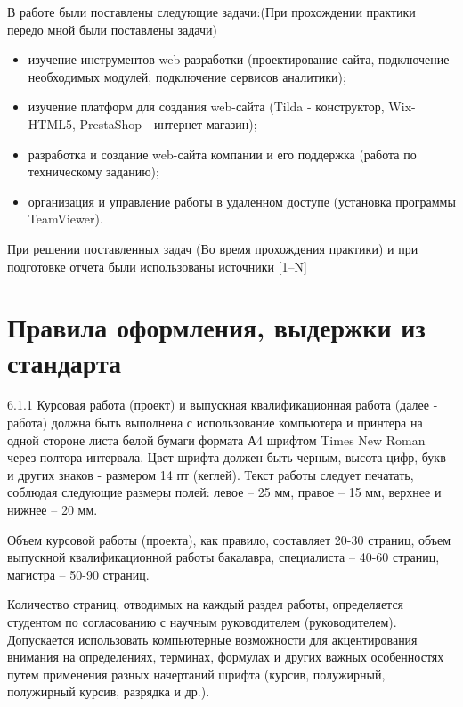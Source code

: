 \documentclass[bachelor, och, coursework, times]{SCWorks}
\begin{document}
В работе были поставлены следующие задачи:(При прохождении практики передо мной были поставлены задачи)
\begin{itemize}
  \item изучение инструментов web-разработки (проектирование сайта, подключение необходимых модулей, подключение сервисов аналитики);
  \item изучение платформ для создания web-сайта (Tilda - конструктор, Wix- HTML5, PrestaShop - интернет-магазин);
  \item разработка и создание web-сайта компании и его поддержка (работа по техническому заданию);
  \item организация и управление работы в удаленном доступе (установка программы TeamViewer).
\end{itemize}

При решении поставленных задач (Во время прохождения практики) и при подготовке отчета были использованы источники [1--N]



\section{Правила оформления, выдержки из стандарта}

6.1.1 Курсовая работа (проект) и выпускная квалификационная работа (далее - работа) должна быть выполнена с использование компьютера и принтера на
одной стороне листа белой бумаги формата А4 шрифтом Times New Roman через
полтора интервала.
Цвет шрифта должен быть черным, высота цифр, букв и других знаков -
размером 14 пт (кеглей).
Текст работы следует печатать, соблюдая следующие размеры полей: левое
– 25 мм, правое – 15 мм, верхнее и нижнее – 20 мм.

Объем курсовой работы (проекта), как правило, составляет 20-30 страниц,
объем выпускной квалификационной работы бакалавра, специалиста – 40-60
страниц, магистра – 50-90 страниц.

Количество страниц, отводимых на каждый раздел работы, определяется
студентом по согласованию с научным руководителем (руководителем).
Допускается использовать компьютерные возможности для акцентирования
внимания на определениях, терминах, формулах и других важных особенностях
путем применения разных начертаний шрифта (курсив, полужирный, полужирный
курсив, разрядка и др.).
\end{document}
